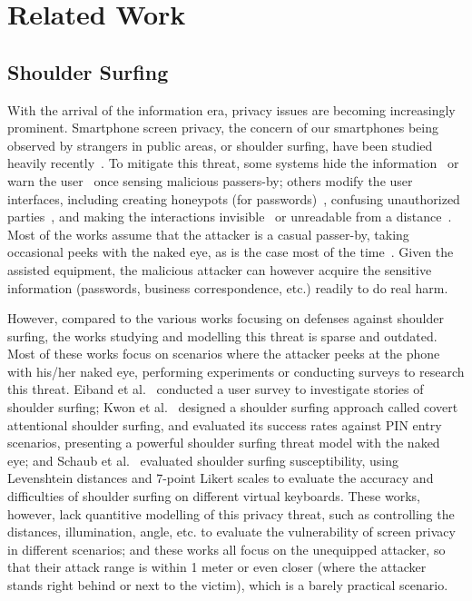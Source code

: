 \section{Related Work}
\label{sec-related-work}

\subsection{Shoulder Surfing}
With the arrival of the information era, privacy issues are becoming increasingly prominent. Smartphone screen privacy, the concern of our smartphones being observed by strangers in public areas, or shoulder surfing, have been studied heavily recently~\cite{eiband2017understanding,goucher2011look,kwon2013covert}. To mitigate this threat, some systems hide the information~\cite{brudy2014anyone} or warn the user~\cite{saad2018communicating} once sensing malicious passers-by; others modify the user interfaces, including creating honeypots (for passwords)~\cite{chakraborty2014tag}, confusing unauthorized parties~\cite{wiedenbeck2006design}, and making the interactions invisible~\cite{kumar2007reducing} or unreadable from a distance~\cite{Chun2019Keep}. Most of the works assume that the attacker is a casual passer-by, taking occasional peeks with the naked eye, as is the case most of the time~\cite{eiband2017understanding,wiedenbeck2006design}. Given the assisted equipment, the malicious attacker can however acquire the sensitive information (passwords, business correspondence, etc.) readily to do real harm.

However, compared to the various works focusing on defenses against shoulder surfing, the works studying and modelling this threat is sparse and outdated. Most of these works focus on scenarios where the attacker peeks at the phone with his/her naked eye, performing experiments or conducting surveys to research this threat. Eiband et al.~\cite{eiband2017understanding} conducted a user survey to investigate stories of shoulder surfing; Kwon et al.~\cite{kwon2013covert} designed a shoulder surfing approach called covert attentional shoulder surfing, and evaluated its success rates against PIN entry scenarios, presenting a powerful shoulder surfing threat model with the naked eye; and Schaub et al.~\cite{schaub2012password} evaluated shoulder surfing susceptibility, using Levenshtein distances and 7-point Likert scales to evaluate the accuracy and difficulties of shoulder surfing on different virtual keyboards. These works, however, lack quantitive modelling of this privacy threat, such as controlling the distances, illumination, angle, etc. to evaluate the vulnerability of screen privacy in different scenarios; and these works all focus on the unequipped attacker, so that their attack range is within 1 meter or even closer (where the attacker stands right behind or next to the victim), which is a barely practical scenario.

